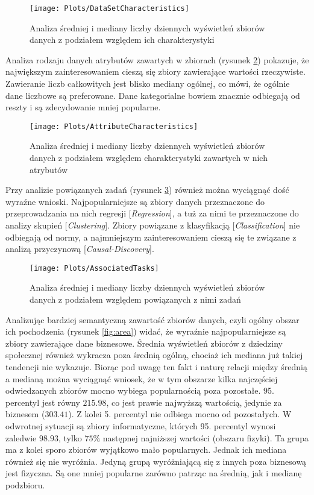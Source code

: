 \begin{figure}[ht]
  \texttt{[image: Plots/DataSetCharacteristics]}
  \caption{Analiza średniej i mediany liczby dziennych wyświetleń zbiorów danych z podziałem względem ich charakterystyki}
  \label{fig:datasetcharacteristics}
\end{figure}

Analiza rodzaju danych atrybutów zawartych w zbiorach (rysunek \ref{fig:attributecharacteristics}) pokazuje, że największym zainteresowaniem cieszą się zbiory zawierające wartości rzeczywiste.
Zawieranie liczb całkowitych jest blisko mediany ogólnej, co mówi, że ogólnie dane liczbowe są preferowane.
Dane kategorialne bowiem znacznie odbiegają od reszty i są zdecydowanie mniej popularne.

\begin{figure}[ht]
  \texttt{[image: Plots/AttributeCharacteristics]}
  \caption{Analiza średniej i mediany liczby dziennych wyświetleń zbiorów danych z podziałem względem charakterystyki zawartych w nich atrybutów}
  \label{fig:attributecharacteristics}
\end{figure}

Przy analizie powiązanych zadań (rysunek \ref{fig:associatedtasks}) również można wyciągnąć dość wyraźne wnioski.
Najpopularniejsze są zbiory danych przeznaczone do przeprowadzania na nich regresji [\emph{Regression}], a tuż za nimi te przeznaczone do analizy skupień [\emph{Clustering}].
Zbiory powiązane z klasyfikacją [\emph{Classification}] nie odbiegają od normy, a najmniejszym zainteresowaniem cieszą się te związane z analizą przyczynową [\emph{Causal-Discovery}].

\begin{figure}[ht]
  \texttt{[image: Plots/AssociatedTasks]}
  \caption{Analiza średniej i mediany liczby dziennych wyświetleń zbiorów danych z podziałem względem powiązanych z nimi zadań}
  \label{fig:associatedtasks}
\end{figure}

Analizując bardziej semantyczną zawartość zbiorów danych, czyli ogólny obszar ich pochodzenia (rysunek \ref{fig:area}) widać, że wyraźnie najpopularniejsze są zbiory zawierające dane biznesowe.
Średnia wyświetleń zbiorów z dziedziny społecznej również wykracza poza średnią ogólną, chociaż ich mediana już takiej tendencji nie wykazuje.
Biorąc pod uwagę ten fakt i naturę relacji między średnią a medianą można wyciągnąć wniosek, że w tym obszarze kilka najczęściej odwiedzanych zbiorów mocno wybiega popularnością poza pozostałe.
95. percentyl jest równy \(215.98\), co jest prawie najwyższą wartością, jedynie za biznesem (\(303.41\)).
Z kolei 5. percentyl nie odbiega mocno od pozostałych.
W odwrotnej sytuacji są zbiory informatyczne, których 95. percentyl wynosi zaledwie \(98.93\), tylko \(75\%\) następnej najniższej wartości (obszaru fizyki).
Ta grupa ma z kolei sporo zbiorów wyjątkowo mało popularnych.
Jednak ich mediana również się nie wyróżnia.
Jedyną grupą wyróżniającą się z innych poza biznesową jest fizyczna.
Są one mniej popularne zarówno patrząc na średnią, jak i medianę podzbioru.

